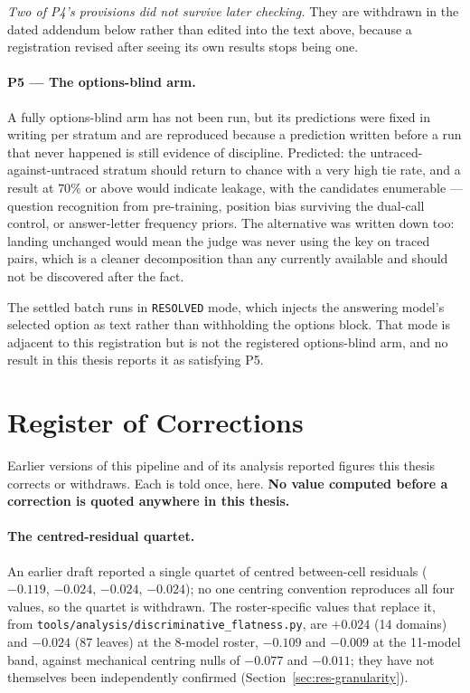 \emph{Two of P4's provisions did not survive later checking.} They are
withdrawn in the dated addendum below rather than edited into the text above,
because a registration revised after seeing its own results stops being one.

\paragraph{P5 --- The options-blind arm.} A fully options-blind arm has not been
run, but its predictions were fixed in writing per stratum and are reproduced
because a prediction written before a run that never happened is still evidence
of discipline. Predicted: the untraced-against-untraced stratum should return to
chance with a very high tie rate, and a result at $70\%$ or above would indicate
leakage, with the candidates enumerable --- question recognition from
pre-training, position bias surviving the dual-call control, or answer-letter
frequency priors. The alternative was written down too: landing unchanged would
mean the judge was never using the key on traced pairs, which is a cleaner
decomposition than any currently available and should not be discovered after
the fact.

The settled batch runs in \texttt{RESOLVED} mode, which injects the answering
model's selected option as text rather than withholding the options block.
That mode is adjacent to this registration but is not the registered
options-blind arm, and no result in this thesis reports it as satisfying P5.

\section{Register of Corrections}\label{app:corrections-register}

Earlier versions of this pipeline and of its analysis reported figures this
thesis corrects or withdraws. Each is told once, here. \textbf{No value computed
before a correction is quoted anywhere in this thesis.}

\paragraph{The centred-residual quartet.} An earlier draft reported a
single quartet of centred between-cell residuals ($-0.119$, $-0.024$,
$-0.024$, $-0.024$); no one centring convention reproduces all four
values, so the quartet is withdrawn. The roster-specific values that
replace it, from \texttt{tools/analysis/discriminative\_flatness.py},
are $+0.024$ (14 domains) and $-0.024$ (87 leaves) at the 8-model
roster, $-0.109$ and $-0.009$ at the 11-model band, against mechanical
centring nulls of $-0.077$ and $-0.011$; they have not themselves been
independently confirmed (Section~\ref{sec:res-granularity}).

